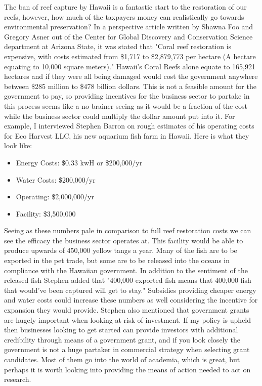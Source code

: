 \documentclass[11pt]{article}
\begin{document}
The ban of reef capture by Hawaii is a fantastic start to the restoration of our reefs, however, how much of the taxpayers money can realistically go towards environmental preservation? In a perspective article written by Shawna Foo and Gregory Asner out of the Center for Global Discovery and Conservation Science department at Arizona State, it was stated that "Coral reef restoration is expensive, with costs estimated from \$1,717 to \$2,879,773 per hectare (A hectare equating to 10,000 square meters)." Hawaii's Coral Reefs alone equate to 165,921 hectares and if they were all being damaged would cost the government anywhere between \$285 million to \$478 billion dollars. This is not a feasible amount for the government to pay, so providing incentives for the business sector to partake in this process seems like a no-brainer seeing as it would be a fraction of the cost while the business sector could multiply the dollar amount put into it. For example, I interviewed Stephen Barron on rough estimates of his operating costs for Eco Harvest LLC, his new aquarium fish farm in Hawaii. Here is what they look like:
\begin{itemize}
  \item Energy Costs: \$0.33 kwH or \$200,000/yr
  \item Water Costs: \$200,000/yr
  \item Operating: \$2,000,000/yr
  \item Facility: \$3,500,000
\end{itemize}

Seeing as these numbers pale in comparison to full reef restoration costs we can see the efficacy the business sector operates at. This facility would be able to produce upwards of 450,000 yellow tangs a year. Many of the fish are to be exported in the pet trade, but some are to be released into the oceans in compliance with the Hawaiian government. In addition to the sentiment of the released fish Stephen added that "400,000 exported fish means that 400,000 fish that would've been captured will get to stay." Subsidies providing cheaper energy and water costs could increase these numbers as well considering the incentive for expansion they would provide. Stephen also mentioned that government grants are hugely important when looking at risk of investment. If my policy is upheld then businesses looking to get started can provide investors with additional credibility through means of a government grant, and if you look closely the government is not a huge partaker in commercial strategy when selecting grant candidates. Most of them go into the world of academia, which is great, but perhaps it is worth looking into providing the means of action needed to act on research.
\end{document}
